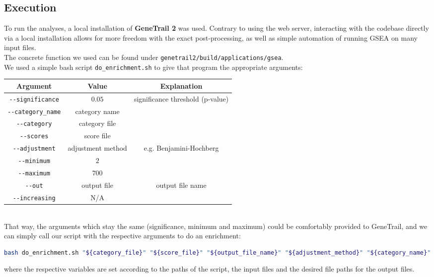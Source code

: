 \subsection{Execution}\label{subsec:td_execution}
To run the analyses, a local installation of \textbf{GeneTrail 2} was used. Contrary to using the web server, interacting with the codebase directly via a local installation allows for more freedom with the exact post-processing, as well as simple automation of running GSEA on many input files.\\
The concrete function we used can be found under \texttt{genetrail2/build/applications/gsea}.\\
We used a simple bash script \lstinline|do_enrichment.sh| to give that program the appropriate arguments:
\begin{table}[h]
    \begin{tabular}{|c|c|c|}
        \hline
        Argument&Value&Explanation\\
        \hline
        \lstinline|--significance|&$0.05$&significance threshold (p-value)\\
        \lstinline|--category_name|&category name&\\
        \lstinline|--category|&category file&\\
        \lstinline|--scores|&score file&\\
        \lstinline|--adjustment|&adjustment method&e.g. Benjamini-Hochberg\\
        \lstinline|--minimum|&$2$&\\
        \lstinline|--maximum|&$700$&\\
        \lstinline|--out|&output file&output file name\\
        \lstinline|--increasing|&N/A&\\
        \hline
    \end{tabular}
\end{table}\\
That way, the arguments which stay the same (significance, minimum and maximum) could be comfortably provided to GeneTrail, and we can simply call our script with the respective arguments to do an enrichment:
\begin{lstlisting}[language=bash, breaklines=true]
bash do_enrichment.sh "${category_file}" "${score_file}" "${output_file_name}" "${adjustment_method}" "${category_name}"
\end{lstlisting}
where the respective variables are set according to the paths of the script, the input files and the desired file paths for the output files.\\
